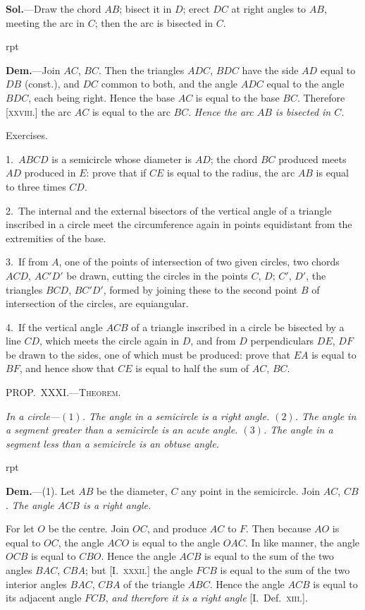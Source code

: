 \documentclass[oneside]{book}
\newcommand\mypropl[2]{
\bigskip\Needspace*{4\baselineskip}\begin{center}\textsc{#1}\end{center}
\hspace{\parindent}\emph{#2}\par\medskip
}
\newcommand\exhead[1]{
\Needspace*{5\baselineskip}\begin{center}
\textsf{#1}
\end{center}
}
\newcommand\imgflow[3]{
\setcounter{wrapwidth}{#1}
\begin{wrapfigure}[#2]{r}{\value{wrapwidth}pt}
\begin{center}
\vspace{-0.3in}
\end{center}
\end{wrapfigure}
}
\begin{document}
\textbf{Sol.}---Draw the chord $AB$; bisect it in $D$; erect $DC$
at right angles to $AB$, meeting the arc in $C$; then the
arc is bisected in $C$.

\imgflow{120}{6}{f136}

\textbf{Dem.}---Join $AC$, $BC$. Then
the triangles $ADC$, $BDC$ have
the side $AD$ equal to $DB$ (const.),
and $DC$ common to both, and
the angle $ADC$ equal to the
angle $BDC$, each being right. Hence the base $AC$ is
equal to the base $BC$. Therefore [\textsc{xxviii.}] the arc $AC$
is equal to the arc $BC$. \emph{Hence the arc $AB$ is bisected
in $C$.}

\exhead{Exercises.}

\begin{footnotesize}
1.~$ABCD$ is a semicircle whose diameter is $AD$; the chord $BC$
produced meets $AD$ produced in $E$: prove that if $CE$ is equal to
the radius, the arc $AB$ is equal to three times $CD$.

2.~The internal and the external bisectors of the vertical angle
of a triangle inscribed in a circle meet the circumference again in
points equidistant from the extremities of the base.

3.~If from $A$, one of the points of intersection of two given
circles, two chords $ACD$, $AC'D'$ be drawn, cutting the circles in
the points $C$, $D$; $C'$, $D'$, the triangles $BCD$, $BC'D'$, formed by
joining these to the second point $B$ of intersection of the circles,
are equiangular.

4.~If the vertical angle $ACB$ of a triangle inscribed in a circle
be bisected by a line $CD$, which meets the circle again in $D$, and
from $D$ perpendiculars $DE$, $DF$ be drawn to the sides, one of
which must be produced: prove that $EA$ is equal to $BF$, and
hence show that $CE$ is equal to half the sum of $AC$, $BC$.
\par\end{footnotesize}


\mypropl{PROP\@.~XXXI\@.---Theorem.}{In a circle---$(1)$. The angle in a semicircle is a right
angle. $(2)$. The angle in a segment greater than a semicircle
is an acute angle. $(3)$. The angle in a segment less
than a semicircle is an obtuse angle.}

\imgflow{140}{13}{f137}

\textbf{Dem.}---(1). Let $AB$ be the diameter, $C$ any point in
the semicircle. Join $AC$, $CB$.
\textit{The angle $ACB$ is a right angle.}

For let $O$ be the centre.
Join $OC$, and produce $AC$ to
$F$. Then because $AO$ is equal
to $OC$, the angle $ACO$ is equal
to the angle $OAC$. In like
manner, the angle $OCB$ is
equal to $CBO$. Hence the
angle $ACB$ is equal to the
sum of the two angles $BAC$,
$CBA$; but [I.\ \textsc{xxxii.}] the
angle $FCB$ is equal to the sum of the two interior
angles $BAC$, $CBA$ of the triangle $ABC$. Hence the
angle $ACB$ is equal to its adjacent angle $FCB$, \textit{and
therefore it is a right angle} [I.\ Def.\ \textsc{xiii.}].
\end{document}
